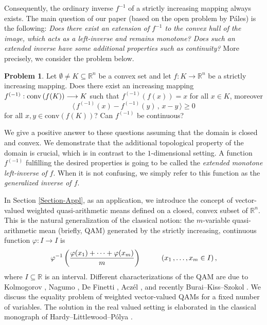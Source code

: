 \documentclass[12pt]{amsart}
\theoremstyle{remark}
\theoremstyle{definition}
\newtheorem{probl}{Problem}
\newcommand{\RR}{\mathbb{R}}
\newcommand{\Rn}{\mathbb{R}^n}
\newcommand{\conv}{\mbox{\rm conv}}
\newcommand{\map}{\longrightarrow}
\begin{document}
Consequently, the ordinary inverse $ f^{-1} $ of a strictly 
increasing mapping always exists. The main question of 
our paper (based on the open problem by Páles) is the 
following: {\em Does there exist an extension of $ f^{-1} $ 
to the convex hull of the image, which acts as a 
left-inverse and remains monotone? 
Does such an extended inverse have some additional 
properties such as continuity?} More precisely, 
we consider the problem below.  

\begin{probl}\label{prob-MainPR}{\cite[4. Problem by Zs. Páles]{60ISFE}}
Let $ \emptyset \neq K \subseteq \Rn $ be a convex set and 
let $ f : K \map \Rn $ be a strictly increasing mapping. 
Does there exist an increasing mapping 
$ f^{(-1)} : \conv \left( f(K) \right) \map K  $ such that 
$ f^{(-1)} \left( f(x) \right) = x $ for all $ x \in K $, 
moreover 
\[
\langle \, f^{(-1)}(x) - f^{(-1)}(y) 
\, , \, 
x - y \, \rangle \geq 0 
\]
for all $ x,y \in \mbox{conv} \left( f(K) \right) $? 
Can $ f^{(-1)} $ be continuous? 
\end{probl}

We give a positive answer to these questions 
assuming that the domain is closed and convex. 
We demonstrate that the additional topological property 
of the domain is crucial, which is in contrast to the 
$1$-dimensional setting. 
A function $ f^{(-1)} $ fulfilling the desired properties 
is going to be called the {\em extended monotone 
left-inverse of $ f $}. When it is not confusing, 
we simply refer to this function 
as the {\em generalized inverse of $ f $}. 

In Section \ref{Section-Appl}, as 
an application, we introduce the concept of vector-valued 
weighted quasi-arithmetic means defined on a closed, convex 
subset of $ \Rn $. This is the natural generalization of 
the classical notion: the $ m $-variable quasi-arithmetic 
mean (briefly, QAM) 
generated by the strictly increasing, continuous 
function $ \varphi : I \map I $ is 
\[
\varphi^{-1} \left( 
\frac{\varphi(x_1) + \dots + \varphi(x_m)}{m} \right)
\hspace{10mm} \left( x_1 \,, \dots , x_m \in I \right), 
\]
where $ I \subseteq \RR $ is an interval. 
Different characterizations of the QAM are due to 
Kolmogorov \cite{Kol30}, Nagumo \cite{Nag30}, 
De Finetti \cite{dFi31}, Aczél \cite{Acz66}, 
and recently Burai--Kiss--Szokol \cite{BKSz21, BKSz23}. 
We discuss the equality problem of 
weighted vector-valued QAMs 
for a fixed number of variables. 
The solution in the real valued setting is elaborated in 
the classical monograph of Hardy--Littlewood--Pólya 
\cite{HLP34}. 
\end{document}
